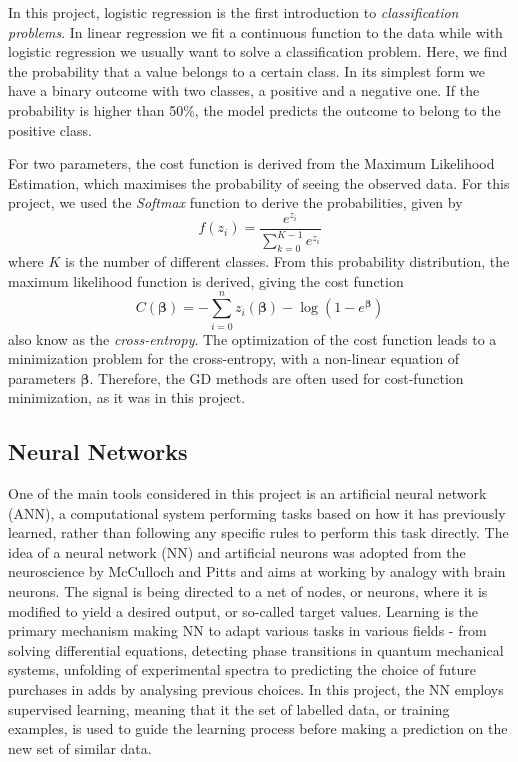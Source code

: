 \documentclass{emulateapj}
\begin{document}
In this project, logistic regression is the first introduction to \textit{classification problems}. In linear regression we fit a continuous function to the data while with logistic regression we usually want to solve a classification problem. Here, we find the probability that a value belongs to a certain class. In its simplest form we have a binary outcome with two classes, a positive and a negative one. If the probability is higher than 50\%, the model predicts the outcome to belong to the positive class.

For two parameters, the cost function is derived from the Maximum Likelihood Estimation, which maximises the probability of seeing the observed data.  For this project, we used the \textit{Softmax} function to derive the probabilities, given by 
\begin{equation}\label{eq:softmax}
    f(z_i)=\frac{e^{z_i}}{\sum_{k=0}^{K-1}e^{z_i}}
\end{equation}
where $K$ is the number of different classes. From this probability distribution, the maximum likelihood function is derived, giving the cost function 
\begin{equation}\label{eq: cross entropy}
    C(\mathbf{\beta}) = -\sum_{i=0}^{n} z_i(\mathbf{\beta}) - \log{(1-e^{\mathbf{\beta}})}
\end{equation}
also know as the \textit{cross-entropy}. The optimization of the cost function leads to a minimization problem for the cross-entropy, with a non-linear equation of parameters $\mathbf{\beta}$. Therefore, the GD methods are often used for cost-function minimization, as it was in this project.

\subsection{Neural Networks}
\label{subsec: NN}

One of the main tools considered in this project is an artificial neural network (ANN), a computational system performing tasks based on how it has previously learned, rather than following any specific rules to perform this task directly.  The idea of a neural network (NN) and artificial neurons was adopted from the neuroscience by McCulloch and Pitts \cite{pitts} and aims at working by analogy with brain neurons.  The signal is being directed to a net of nodes, or neurons, where it is modified to yield a desired output, or so-called target values. Learning is the primary mechanism making NN to adapt various tasks in various fields - from solving differential equations, detecting phase transitions in quantum mechanical systems, unfolding of experimental spectra to predicting the choice of future purchases in adds by analysing previous choices. In this project, the NN employs supervised learning, meaning that it the set of labelled data, or training examples, is used to guide the learning process before making a prediction on the new set of similar data. 
\end{document}
